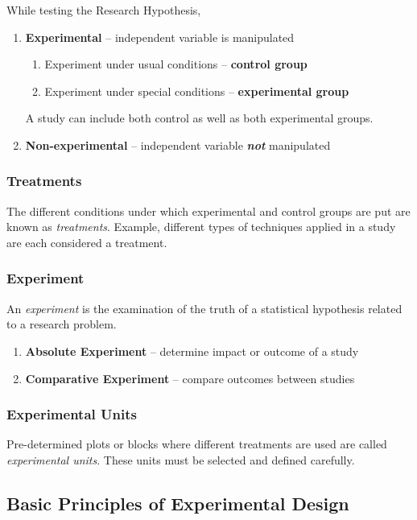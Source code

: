 \documentclass{article}
\begin{document}
While testing the Research Hypothesis,
\begin{enumerate}
    \item \textbf{Experimental} -- independent variable is manipulated
    \begin{enumerate}
        \item Experiment under usual conditions -- \textbf{control group}
        \item Experiment under special conditions -- \textbf{experimental group}
    \end{enumerate}
    A study can include both control as well as both experimental groups.
    \item \textbf{Non-experimental} -- independent variable \textit{\textbf{not}} manipulated
\end{enumerate}

\subsubsection{Treatments}

The different conditions under which experimental and control groups are put are known as \textit{treatments}. Example, different types of techniques applied in a study are each considered a treatment.

\subsubsection{Experiment}

An \textit{experiment} is the examination of the truth of a statistical hypothesis related to a research problem. 

\begin{enumerate}
    \item \textbf{Absolute Experiment} -- determine impact or outcome of a study
    \item \textbf{Comparative Experiment} -- compare outcomes between studies
\end{enumerate}

\subsubsection{Experimental Units}

Pre-determined plots or blocks where different treatments are used are called \textit{experimental units}. These units must be selected and defined carefully.

\subsection{Basic Principles of Experimental Design}
\end{document}
